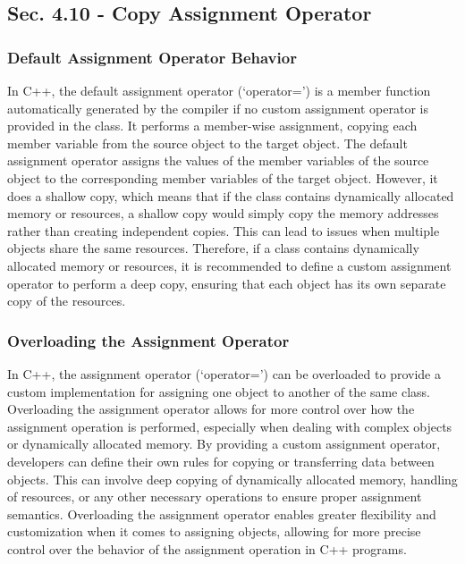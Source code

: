 \subsection*{Sec. 4.10 - Copy Assignment Operator}

\subsubsection{Default Assignment Operator Behavior}

In C++, the default assignment operator (`operator=') is a member function automatically generated by the compiler if no custom assignment operator is provided in the class. It performs a member-wise assignment, copying each member variable from the source object to 
the target object. The default assignment operator assigns the values of the member variables of the source object to the corresponding member variables of the target object. However, it does a shallow copy, which means that if the class contains dynamically allocated 
memory or resources, a shallow copy would simply copy the memory addresses rather than creating independent copies. This can lead to issues when multiple objects share the same resources. Therefore, if a class contains dynamically allocated memory or resources, it is 
recommended to define a custom assignment operator to perform a deep copy, ensuring that each object has its own separate copy of the resources.

\subsubsection{Overloading the Assignment Operator}

In C++, the assignment operator (`operator=') can be overloaded to provide a custom implementation for assigning one object to another of the same class. Overloading the assignment operator allows for more control over how the assignment operation is performed, 
especially when dealing with complex objects or dynamically allocated memory. By providing a custom assignment operator, developers can define their own rules for copying or transferring data between objects. This can involve deep copying of dynamically allocated memory, 
handling of resources, or any other necessary operations to ensure proper assignment semantics. Overloading the assignment operator enables greater flexibility and customization when it comes to assigning objects, allowing for more precise control over the behavior of 
the assignment operation in C++ programs.

